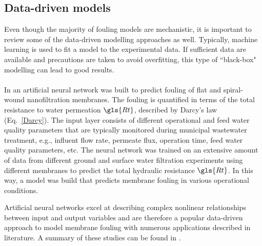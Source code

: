 



\subsection{Data-driven models}
Even though the majority of fouling models are mechanistic, it is important to review some of the data-driven modelling approaches as well. Typically, machine learning is used to fit a model to the experimental data.
If sufficient data are available and precautions are taken to avoid overfitting, this type of ``black-box" modelling can lead to good results.\\ \\
In \citet{Shetty2003} an artificial neural network was built to predict fouling of flat and spiral-wound nanofiltration membranes. The fouling is quantified in terms of the total resistance to water permeation $\gls{Rt}$, described by Darcy's law (Eq.\ \ref{Darcy}). The input layer consists of different operational and feed water quality parameters that are typically monitored during municipal wastewater treatment, e.g., influent flow rate, permeate flux, operation time, feed water quality parameters, etc. The neural network was trained on an extensive amount of data from different ground and surface water filtration experiments using different membranes to predict the total hydraulic resistance $\gls{Rt}$. In this way, a model was build that predicts membrane fouling in various operational conditions. \par
Artificial neural networks excel at describing complex nonlinear relationships between input and output variables \citep{Tu1996} and are therefore a popular data-driven approach to model membrane fouling with numerous applications described in literature. A summary of these studies can be found in \cite{Mirbagheri2015}. \\ \\  %
